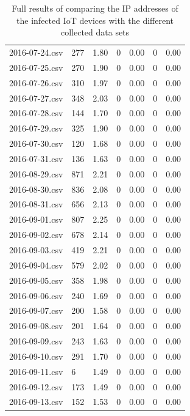 \documentclass[a4paper,10pt]{article}
\begin{document}
\begin{table}[h]
\begin{tabularx}{\linewidth}{lXXXXXX}
2016-07-24.csv & 277 & 1.80 & 0 & 0.00 & 0 & 0.00 \\
2016-07-25.csv & 270 & 1.90 & 0 & 0.00 & 0 & 0.00 \\
2016-07-26.csv & 310 & 1.97 & 0 & 0.00 & 0 & 0.00 \\
2016-07-27.csv & 348 & 2.03 & 0 & 0.00 & 0 & 0.00 \\
2016-07-28.csv & 144 & 1.70 & 0 & 0.00 & 0 & 0.00 \\
2016-07-29.csv & 325 & 1.90 & 0 & 0.00 & 0 & 0.00 \\
2016-07-30.csv & 120 & 1.68 & 0 & 0.00 & 0 & 0.00 \\
2016-07-31.csv & 136 & 1.63 & 0 & 0.00 & 0 & 0.00 \\
2016-08-29.csv & 871 & 2.21 & 0 & 0.00 & 0 & 0.00 \\
2016-08-30.csv & 836 & 2.08 & 0 & 0.00 & 0 & 0.00 \\
2016-08-31.csv & 656 & 2.13 & 0 & 0.00 & 0 & 0.00 \\
2016-09-01.csv & 807 & 2.25 & 0 & 0.00 & 0 & 0.00 \\
2016-09-02.csv & 678 & 2.14 & 0 & 0.00 & 0 & 0.00 \\
2016-09-03.csv & 419 & 2.21 & 0 & 0.00 & 0 & 0.00 \\
2016-09-04.csv & 579 & 2.02 & 0 & 0.00 & 0 & 0.00 \\
2016-09-05.csv & 358 & 1.98 & 0 & 0.00 & 0 & 0.00 \\
2016-09-06.csv & 240 & 1.69 & 0 & 0.00 & 0 & 0.00 \\
2016-09-07.csv & 200 & 1.58 & 0 & 0.00 & 0 & 0.00 \\
2016-09-08.csv & 201 & 1.64 & 0 & 0.00 & 0 & 0.00 \\
2016-09-09.csv & 243 & 1.63 & 0 & 0.00 & 0 & 0.00 \\
2016-09-10.csv & 291 & 1.70 & 0 & 0.00 & 0 & 0.00 \\
2016-09-11.csv & 6 & 1.49 & 0 & 0.00 & 0 & 0.00 \\
2016-09-12.csv & 173 & 1.49 & 0 & 0.00 & 0 & 0.00 \\
2016-09-13.csv & 152 & 1.53 & 0 & 0.00 & 0 & 0.00 \\
 \bottomrule
 \end{tabularx}
 \caption{Full results of comparing the IP addresses of the infected IoT devices with the different collected data sets}
 \label{tbl:results_full}
\end{table}
\end{document}
